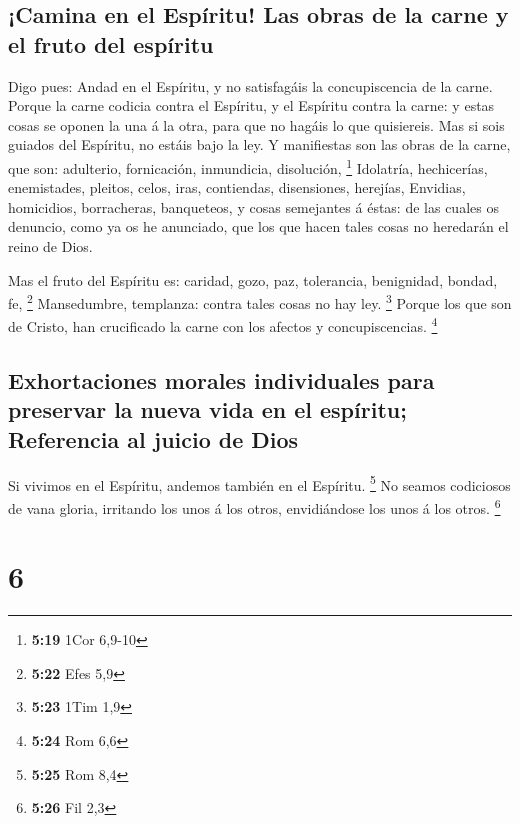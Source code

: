 \hypertarget{camina-en-el-espuxedritu-las-obras-de-la-carne-y-el-fruto-del-espuxedritu}{%
\subsection{¡Camina en el Espíritu! Las obras de la carne y el fruto del
espíritu}\label{camina-en-el-espuxedritu-las-obras-de-la-carne-y-el-fruto-del-espuxedritu}}

 Digo pues: Andad en el Espíritu, y no satisfagáis la
concupiscencia de la carne.  Porque la carne codicia
contra el Espíritu, y el Espíritu contra la carne: y estas cosas se
oponen la una á la otra, para que no hagáis lo que quisiereis.
 Mas si sois guiados del Espíritu, no estáis bajo la ley.
 Y manifiestas son las obras de la carne, que son:
adulterio, fornicación, inmundicia, disolución, \footnote{\textbf{5:19}
  1Cor 6,9-10}  Idolatría, hechicerías, enemistades,
pleitos, celos, iras, contiendas, disensiones, herejías, 
Envidias, homicidios, borracheras, banqueteos, y cosas semejantes á
éstas: de las cuales os denuncio, como ya os he anunciado, que los que
hacen tales cosas no heredarán el reino de Dios.

 Mas el fruto del Espíritu es: caridad, gozo, paz,
tolerancia, benignidad, bondad, fe, \footnote{\textbf{5:22} Efes 5,9}
 Mansedumbre, templanza: contra tales cosas no hay ley.
\footnote{\textbf{5:23} 1Tim 1,9}  Porque los que son de
Cristo, han crucificado la carne con los afectos y concupiscencias.
\footnote{\textbf{5:24} Rom 6,6}

\hypertarget{exhortaciones-morales-individuales-para-preservar-la-nueva-vida-en-el-espuxedritu-referencia-al-juicio-de-dios}{%
\subsection{Exhortaciones morales individuales para preservar la nueva
vida en el espíritu; Referencia al juicio de
Dios}\label{exhortaciones-morales-individuales-para-preservar-la-nueva-vida-en-el-espuxedritu-referencia-al-juicio-de-dios}}

 Si vivimos en el Espíritu, andemos también en el
Espíritu. \footnote{\textbf{5:25} Rom 8,4}  No seamos
codiciosos de vana gloria, irritando los unos á los otros, envidiándose
los unos á los otros. \footnote{\textbf{5:26} Fil 2,3}

\hypertarget{section-5}{%
\section{6}\label{section-5}}

